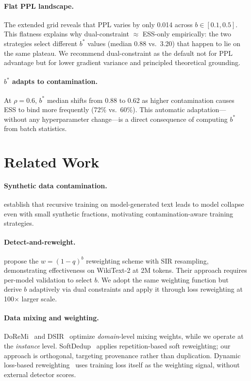 \documentclass[11pt,a4paper]{article}
\newcommand{\bstar}{b^{*}}
\begin{document}
\paragraph{Flat PPL landscape.}
The extended grid reveals that PPL varies by only 0.014 across $b\in[0.1,0.5]$.
This flatness explains why dual-constraint $\approx$ ESS-only empirically: the two strategies select different $\bstar$ values (median 0.88 vs.\ 3.20) that happen to lie on the same plateau.
We recommend dual-constraint as the default not for PPL advantage but for lower gradient variance and principled theoretical grounding.

\paragraph{$\bstar$ adapts to contamination.}
At $\rho=0.6$, $\bstar$ median shifts from 0.88 to 0.62 as higher contamination causes ESS to bind more frequently (72\% vs.\ 60\%).
This automatic adaptation---without any hyperparameter change---is a direct consequence of computing $\bstar$ from batch statistics.

\section{Related Work}
\label{sec:related}

\paragraph{Synthetic data contamination.}
\citet{strong-collapse-iclr2025} establish that recursive training on model-generated text leads to model collapse even with small synthetic fractions, motivating contamination-aware training strategies.

\paragraph{Detect-and-reweight.}
\citet{drayson-emnlp2025} propose the $w=(1-q)^b$ reweighting scheme with SIR resampling, demonstrating effectiveness on WikiText-2 at 2M tokens.
Their approach requires per-model validation to select $b$.
We adopt the same weighting function but derive $b$ adaptively via dual constraints and apply it through loss reweighting at 100$\times$ larger scale.

\paragraph{Data mixing and weighting.}
DoReMi~\citep{doremi} and DSIR~\citep{dsir} optimize \emph{domain}-level mixing weights, while we operate at the \emph{instance} level.
SoftDedup~\citep{softdedup} applies repetition-based soft reweighting; our approach is orthogonal, targeting provenance rather than duplication.
Dynamic loss-based reweighting~\citep{dynamic-loss} uses training loss itself as the weighting signal, without external detector scores.
\end{document}
